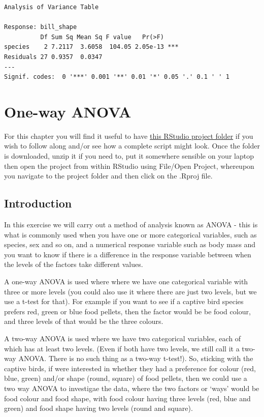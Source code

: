 \documentclass[
  letterpaper,
  DIV=11,
  numbers=noendperiod]{scrreprt}
\begin{document}
\begin{verbatim}
Analysis of Variance Table

Response: bill_shape
          Df Sum Sq Mean Sq F value   Pr(>F)    
species    2 7.2117  3.6058  104.05 2.05e-13 ***
Residuals 27 0.9357  0.0347                     
---
Signif. codes:  0 '***' 0.001 '**' 0.01 '*' 0.05 '.' 0.1 ' ' 1
\end{verbatim}

\chapter{One-way ANOVA}\label{one-way-anova}

\vspace{-10mm}

For this chapter you will find it useful to have
\href{https://github.com/mbh038/ANOVA-one-way/archive/refs/heads/main.zip}{this
RStudio project folder} if you wish to follow along and/or see how a
complete script might look. Once the folder is downloaded, unzip it if
you need to, put it somewhere sensible on your laptop then open the
project from within RStudio using File/Open Project, whereupon you
navigate to the project folder and then click on the .Rproj file.

\section{Introduction}\label{introduction-1}

In this exercise we will carry out a method of analysis known as ANOVA -
this is what is commonly used when you have one or more categorical
variables, such as species, sex and so on, and a numerical response
variable such as body mass and you want to know if there is a difference
in the response variable between when the levels of the factors take
different values.

A one-way ANOVA is used where where we have one categorical variable
with three or more levels (you could also use it where there are just
two levels, but we use a t-test for that). For example if you want to
see if a captive bird species prefers red, green or blue food pellets,
then the factor would be be food colour, and three levels of that would
be the three colours.

A two-way ANOVA is used where we have two categorical variables, each of
which has at least two levels. (Even if both have two levels, we still
call it a two-way ANOVA. There is no such thing as a two-way t-test!).
So, sticking with the captive birds, if were interested in whether they
had a preference for colour (red, blue, green) and/or shape (round,
square) of food pellets, then we could use a two way ANOVA to investigae
the data, where the two factors or `ways' would be food colour and food
shape, with food colour having three levels (red, blue and green) and
food shape having two levels (round and square).
\end{document}

